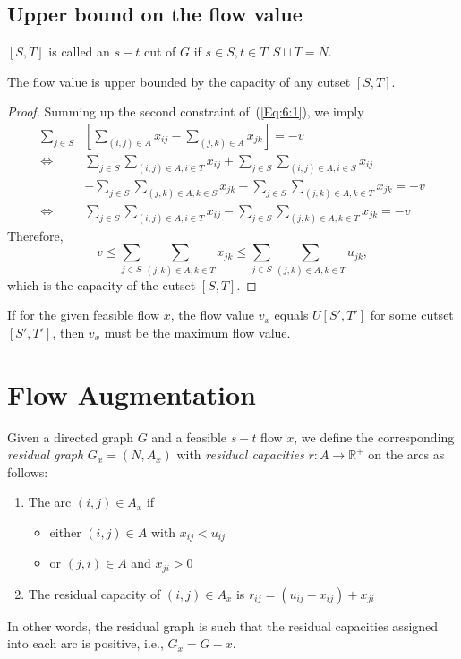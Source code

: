 \subsection{Upper bound on the flow value}
\begin{definition}
$[S,T]$ is called an $s-t$ cut of $G$ if $s\in S,t\in T, S\sqcup T=N$.
\end{definition}

\begin{theorem}
The flow value is upper bounded by the capacity of any cutset $[S,T]$.
\end{theorem}
\begin{proof}
Summing up the second constraint of~(\ref{Eq:6:1}), we imply
\begin{align*}
\sum_{j\in S}&\left[\sum_{(i,j)\in A}x_{ij} - \sum_{(j,k)\in A}x_{jk}\right]=-v\\
\Longleftrightarrow&\sum_{j\in S}\sum_{(i,j)\in A, i\in T}x_{ij}
+
\sum_{j\in S}\sum_{(i,j)\in A, i\in S}x_{ij}
\\&-
\sum_{j\in S}\sum_{(j,k)\in A, k\in S}x_{jk}
-
\sum_{j\in S}\sum_{(j,k)\in A, k\in T}x_{jk}=-v\\
\Longleftrightarrow&\sum_{j\in S}\sum_{(i,j)\in A, i\in T}x_{ij}-\sum_{j\in S}\sum_{(j,k)\in A, k\in T}x_{jk}=-v
\end{align*}
Therefore,
\[
v\le \sum_{j\in S}\sum_{(j,k)\in A, k\in T}x_{jk}\le \sum_{j\in S}\sum_{(j,k)\in A, k\in T}u_{jk},
\]
which is the capacity of the cutset $[S,T]$.
\end{proof}
\begin{corollary}
If for the given feasible flow $x$, the flow value $v_x$ equals $U[S',T']$ for some cutset $[S',T']$, then $v_x$ must be the maximum flow value.
\end{corollary}

\section{Flow Augmentation}
\begin{definition}
Given a directed graph $G$ and a feasible $s-t$ flow $x$, we define the corresponding \emph{residual graph} $G_x=(N,A_x)$ with \emph{residual capacities} $r:A\to\mathbb{R}^+$ on the arcs as follows:
\begin{enumerate}
\item
The arc $(i,j)\in A_x$ if 
\begin{itemize}
\item
either $(i,j)\in A$ with $x_{ij}< u_{ij}$
\item
or $(j,i)\in A$ and $x_{ji}>0$
\end{itemize}
\item
The residual capacity of $(i,j)\in A_x$ is $r_{ij} = (u_{ij} - x_{ij}) + x_{ji}$
\end{enumerate}
In other words, the residual graph is such that the residual capacities assigned into each arc is positive, i.e., $G_x = G - x$.
\end{definition}

